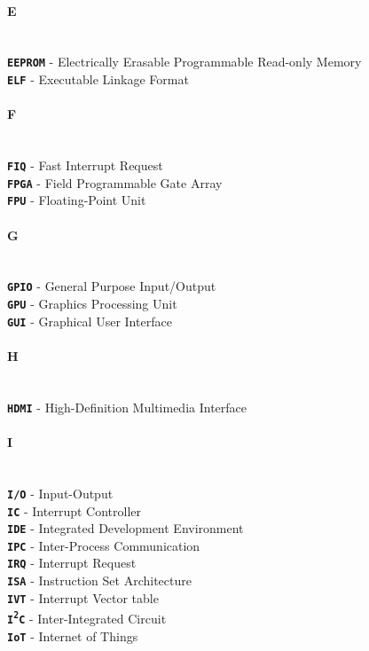 \documentclass[english, ing, kiv, he, iso690numb, pdf]{fasthesis}
\begin{document}
	\paragraph{E}
	\\
	\noindent
	\textbf{\texttt{EEPROM}} - Electrically Erasable Programmable Read-only Memory \\
	\textbf{\texttt{ELF}} - Executable Linkage Format \\
	\paragraph{F}
	\\
	\noindent
	\textbf{\texttt{FIQ}} - Fast Interrupt Request \\
	\textbf{\texttt{FPGA}} - Field Programmable Gate Array \\
	\textbf{\texttt{FPU}} - Floating-Point Unit \\
	\newpage
	\paragraph{G}
	\\
	\noindent
	\textbf{\texttt{GPIO}} - General Purpose Input/Output \\
	\textbf{\texttt{GPU}} - Graphics Processing Unit \\
	\textbf{\texttt{GUI}} - Graphical User Interface \\
	\paragraph{H}
	\\
	\noindent
	\textbf{\texttt{HDMI}} - High-Definition Multimedia Interface \\
	\paragraph{I}
	\\
	\noindent
	\textbf{\texttt{I/O}} - Input-Output \\
	\textbf{\texttt{IC}} - Interrupt Controller \\
	\textbf{\texttt{IDE}} - Integrated Development Environment \\
	\textbf{\texttt{IPC}} - Inter-Process Communication \\
	\textbf{\texttt{IRQ}} - Interrupt Request \\
	\textbf{\texttt{ISA}} - Instruction Set Architecture \\
	\textbf{\texttt{IVT}} - Interrupt Vector table \\
	\textbf{\texttt{I\textsuperscript{2}C}} - Inter-Integrated Circuit \\
	\textbf{\texttt{IoT}} - Internet of Things \\
	
\end{document}
